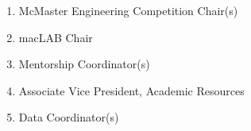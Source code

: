 \begin{enumerate}
  \begin{enumerate}
   \item
    McMaster Engineering Competition Chair(s)
   \item
    macLAB Chair
   \item
    Mentorship Coordinator(s)
   \item
    Associate Vice President, Academic Resources
   \item
    Data Coordinator(s)

  \end{enumerate}
\end{enumerate}